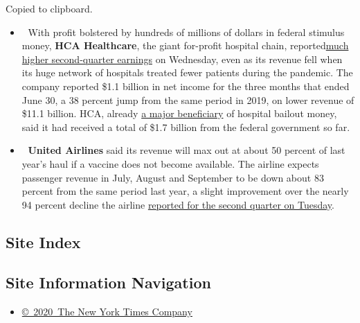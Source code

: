Copied to clipboard.

\begin{itemize}
\item
  💉 With profit bolstered by hundreds of millions of dollars in federal
  stimulus money, \textbf{HCA Healthcare}, the giant for-profit hospital
  chain,
  reported\href{https://investor.hcahealthcare.com/news/news-details/2020/HCA-Healthcare-Reports-Second-Quarter-2020-Results/default.aspx}{much
  higher second-quarter earnings} on Wednesday, even as its revenue fell
  when its huge network of hospitals treated fewer patients during the
  pandemic. The company reported \$1.1 billion in net income for the
  three months that ended June 30, a 38 percent jump from the same
  period in 2019, on lower revenue of \$11.1 billion. HCA, already
  \href{https://www.nytimes.com/2020/06/08/business/hospitals-bailouts-ceo-pay.html}{a
  major beneficiary} of hospital bailout money, said it had received a
  total of \$1.7 billion from the federal government so far.
\item
  🛬 \textbf{United Airlines} said its revenue will max out at about 50
  percent of last year's haul if a vaccine does not become available.
  The airline expects passenger revenue in July, August and September to
  be down about 83 percent from the same period last year, a slight
  improvement over the nearly 94 percent decline the airline
  \href{https://www.nytimes.com/live/2020/07/21/business/stock-market-today-coronavirus\#united-earnings}{reported
  for the second quarter on Tuesday}.
\end{itemize}

\hypertarget{site-index}{%
\subsection{Site Index}\label{site-index}}

\hypertarget{site-information-navigation}{%
\subsection{Site Information
Navigation}\label{site-information-navigation}}

\begin{itemize}
\tightlist
\item
  \href{https://help.nytimes.com/hc/en-us/articles/115014792127-Copyright-notice}{©~2020~The
  New York Times Company}
\end{itemize}

